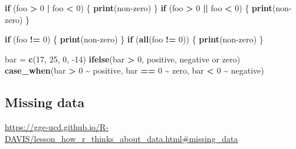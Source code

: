 \documentclass[
]{article}
\newenvironment{Shaded}{\begin{snugshade}}{\end{snugshade}}
\newcommand{\ControlFlowTok}[1]{\textcolor[rgb]{0.13,0.29,0.53}{\textbf{#1}}}
\newcommand{\DecValTok}[1]{\textcolor[rgb]{0.00,0.00,0.81}{#1}}
\newcommand{\KeywordTok}[1]{\textcolor[rgb]{0.13,0.29,0.53}{\textbf{#1}}}
\newcommand{\NormalTok}[1]{#1}
\newcommand{\OperatorTok}[1]{\textcolor[rgb]{0.81,0.36,0.00}{\textbf{#1}}}
\newcommand{\StringTok}[1]{\textcolor[rgb]{0.31,0.60,0.02}{#1}}
\begin{document}
\begin{Shaded}
\begin{Highlighting}[]
\ControlFlowTok{if}\NormalTok{ (foo }\OperatorTok{\textgreater{}}\StringTok{ }\DecValTok{0} \OperatorTok{|}\StringTok{ }\NormalTok{foo }\OperatorTok{\textless{}}\StringTok{ }\DecValTok{0}\NormalTok{) \{}
  \KeywordTok{print}\NormalTok{(}\StringTok{\textquotesingle{}non{-}zero\textquotesingle{}}\NormalTok{)}
\NormalTok{\}}
\ControlFlowTok{if}\NormalTok{ (foo }\OperatorTok{\textgreater{}}\StringTok{ }\DecValTok{0} \OperatorTok{||}\StringTok{ }\NormalTok{foo }\OperatorTok{\textless{}}\StringTok{ }\DecValTok{0}\NormalTok{) \{}
  \KeywordTok{print}\NormalTok{(}\StringTok{\textquotesingle{}non{-}zero\textquotesingle{}}\NormalTok{)}
\NormalTok{\}}

\ControlFlowTok{if}\NormalTok{ (foo }\OperatorTok{!=}\StringTok{ }\DecValTok{0}\NormalTok{) \{}
  \KeywordTok{print}\NormalTok{(}\StringTok{\textquotesingle{}non{-}zero\textquotesingle{}}\NormalTok{)}
\NormalTok{\}}
\ControlFlowTok{if}\NormalTok{ (}\KeywordTok{all}\NormalTok{(foo }\OperatorTok{!=}\StringTok{ }\DecValTok{0}\NormalTok{)) \{}
  \KeywordTok{print}\NormalTok{(}\StringTok{\textquotesingle{}non{-}zero\textquotesingle{}}\NormalTok{)}
\NormalTok{\}}

\NormalTok{bar =}\StringTok{ }\KeywordTok{c}\NormalTok{(}\DecValTok{17}\NormalTok{, }\DecValTok{25}\NormalTok{, }\DecValTok{0}\NormalTok{, }\DecValTok{{-}14}\NormalTok{)}
\KeywordTok{ifelse}\NormalTok{(bar }\OperatorTok{\textgreater{}}\StringTok{ }\DecValTok{0}\NormalTok{, }\StringTok{\textquotesingle{}positive\textquotesingle{}}\NormalTok{, }\StringTok{\textquotesingle{}negative or zero\textquotesingle{}}\NormalTok{)}
\KeywordTok{case\_when}\NormalTok{(bar }\OperatorTok{\textgreater{}}\StringTok{ }\DecValTok{0}  \OperatorTok{\textasciitilde{}}\StringTok{ \textquotesingle{}positive\textquotesingle{}}\NormalTok{, }
\NormalTok{          bar }\OperatorTok{==}\StringTok{ }\DecValTok{0} \OperatorTok{\textasciitilde{}}\StringTok{ \textquotesingle{}zero\textquotesingle{}}\NormalTok{, }
\NormalTok{          bar }\OperatorTok{\textless{}}\StringTok{ }\DecValTok{0}  \OperatorTok{\textasciitilde{}}\StringTok{ \textquotesingle{}negative\textquotesingle{}}\NormalTok{)}
\end{Highlighting}
\end{Shaded}

\hypertarget{missing-data}{%
\subsection{Missing data}\label{missing-data}}

\url{https://gge-ucd.github.io/R-DAVIS/lesson_how_r_thinks_about_data.html\#missing_data}
\end{document}
